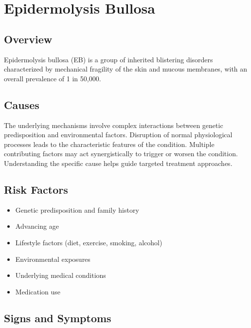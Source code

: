 \chapter{Epidermolysis Bullosa}
\label{sec:Epidermolysis Bullosa}

\section{Overview}
Epidermolysis bullosa (EB) is a group of inherited blistering disorders characterized by mechanical fragility of the skin and mucous membranes, with an overall prevalence of 1 in 50,000.
\section{Causes}
The underlying mechanisms involve complex interactions between genetic predisposition and environmental factors. Disruption of normal physiological processes leads to the characteristic features of the condition. Multiple contributing factors may act synergistically to trigger or worsen the condition. Understanding the specific cause helps guide targeted treatment approaches.
\section{Risk Factors}


\begin{itemize}[noitemsep]
  \item Genetic predisposition and family history
  \item Advancing age
  \item Lifestyle factors (diet, exercise, smoking, alcohol)
  \item Environmental exposures
  \item Underlying medical conditions
  \item Medication use
\end{itemize}
\section{Signs and Symptoms}


